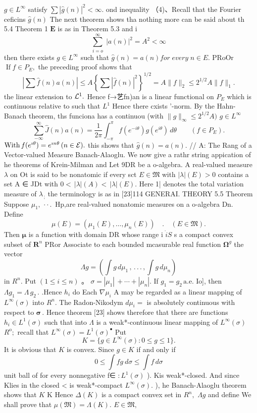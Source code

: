 $g\in L^{\infty}$ satisfy $\textstyle\sum\left|{\hat{g}}(n)\right|^{2}<\infty.$ ond inequality （4)、Recall that the Fourier ceficins $\scriptstyle{\hat{g}}(n)$ The next theorem shows tha nothing more can be said about th 5.4 Theorem 1 $\boldsymbol{E}$ is as in Theorem 5.3 and i $$ \sum_{i=o}^{\infty}\;|a(n)|^{2}=A^{2}<\infty $$ then there exists $g\in L^{\infty}$ such that $\hat{g}(n)=a(n)f o r\;e v e r y\;n\in E.$ PRoOr $\operatorname{If}f\in P_{E},$ the preceding proof shows that $$ \left|\sum\hat{f}(n)a(n)\right|\leq A\left\{\sum|\hat{f}(n)|^{2}\right\}^{1/2}=A\|f\|_{2}\leq2^{1/2}A\|f\|_{1}. $$ the linear extension to ${\cal L}^{1}.$ Hence f→艺fn)an is a linear functional on $P_{\scriptscriptstyle{E}}$ which is continuous relative to such that $L^{1}$ Hence there cxists '-norm. By the Hahn-Banach theorem, ths funciona has a continuou (with $\|g\|_{\infty}\leq2^{1/2}A)$ $g\in L^{\infty}$ $$ \sum_{-\infty}^{\infty}\hat{J}(n)a(n)=\frac{1}{2\pi}\int_{-\pi}^{\pi}f(e^{-i\theta})g(e^{i\theta})\,d\theta\qquad(f\in P_{E}). $$ $\mathrm{With}\,f(e^{\imath\theta})=e^{\imath n\theta}\,(n\in{\cal E}).$ this shows that ${\hat{g}}(n)=a(n).$ // A: The Rang of a Vector-valued Measure Banach-Alaoglu. We now give a rathr string appication of he theorems of Krein-Milman and Let 9DR be a o-algebra. A real-valued measure $\lambda$ on Ot is said to be nonatomic if every sct $E\in{\mathfrak{M}}$ with $|\lambda|(E)>0$ contains a set A ∈ JDt with $\textstyle0<\,|\lambda|(A)<\,|\lambda|(E).$ Here 1| denotes the total variation measure of $\lambda_{\,;}$ the terminology is as in [23]114 GENERAI. THEORY 5.5 Theorem Suppose $\mu_{1},\,\cdot\cdot\,.\,$ Hp,are real-valued nonatomic measures on a o-algebra Dn. Define $$ \mu(E)=(\mu_{1}(E),\ldots,\mu_{n}(E))\quad.\quad(E\in\mathfrak{M}). $$ Then $\boldsymbol{\mu}$ is a function with domain DR whose range i $\dot{\mathit{i}}S$ s a compact convex subset of ${\boldsymbol{R}}^{n}$ PRor Associate to each bounded mcasurable real function $\mathbf{\Omega}^{g}$ the vector $$ \Lambda g=\left(\int g\,d\mu_{1}\,,\,.\,.\,.\,,\int g\,d\mu_{n}\right) $$ in $R^{n}.$ Put $(1\leq i\leq n)$ 。 $\sigma=|\mu_{1}|\,+\cdots+|\mu_{n}|.$ If $g_{1}=g_{2}\,\mathrm{a.e.}$ Io], then $\Lambda g_{1}=\Lambda\,g_{2}\,.$ .Hence $h_{i}$ do Each $\textstyle{\mathit{\nabla}}\mu_{i}$ A may be regarded as a linear mapping of $L^{\infty}(\sigma)$ into $\textstyle R^{n}.$ The Radon-Nikodym $d\mu_{i}=$ is absolutely continuous with respect to ${\boldsymbol{\sigma}}\,.$ Hence theorem [23] shows therefore that there are functions $h_{i}\in L^{1}(\sigma)$ such that into $\Lambda$ is a weak*-continuous linear mapping of $L^{\infty}(\sigma)$ $R^{\mathrm{o}};$ recall that $L^{\infty}(\sigma)=L^{1}(\sigma)^{\bullet}$ Put $$ K=\{g\in L^{\infty}(\sigma):0\leq g\leq1\}. $$ It is obvious that $K$ is convex. Since $g\in K$ if and only if $$ 0\leq\int\!f g~d\sigma\leq\int\!f\,d\sigma $$ unit ball of for every nonnegative f∈ $:L^{1}(\sigma)$ ). Kis weak*-closed. And since Klies in the closed < is weak*-compact $L^{\infty}(\sigma).$ ), he Banach-Alaoglu theorem shows that $\textstyle K$ K Hence $\Delta(K)$ is a compact convex set in $\textstyle R^{n}\!,$ $\Lambda g$ and define We shall prove that $\mu({\mathfrak{M}})=\Lambda(K).$ $E\in{\mathfrak{M}},$ 